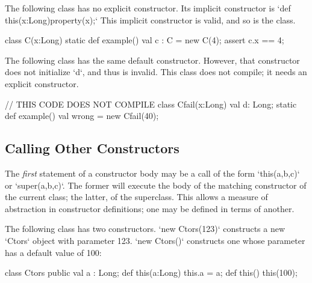 \begin{ex}
The following class has no explicit constructor.
Its implicit constructor is 
\xcd`def this(x:Long){property(x);}`
This implicit constructor is valid, and so is the class. 
\begin{xten}
class C(x:Long) {
  static def example() {
    val c : C = new C(4);
    assert c.x == 4;
  }
}
\end{xten}
\noindent 


The following class has the same default constructor.  However, that
constructor does not initialize \xcd`d`, and thus is invalid.  This 
class does not compile; it needs an explicit constructor.
\begin{xten}
// THIS CODE DOES NOT COMPILE
class Cfail(x:Long) {
  val d: Long;
  static def example() {
    val wrong = new Cfail(40);
  }
}
\end{xten}
%


\end{ex}

\subsection{Calling Other Constructors}
\label{sect:call-another-ctor}

The {\em first} statement of a constructor body may be a call of the form 
\xcd`this(a,b,c)` or \xcd`super(a,b,c)`.  The former will execute the body of
the matching constructor of the current class; the latter, of the superclass. 
This allows a measure of abstraction in constructor definitions; one may be
defined in terms of another.

\begin{ex}
The following class has two constructors.  \xcd`new Ctors(123)` constructs a
new \xcd`Ctors` object with parameter 123.  \xcd`new Ctors()` constructs one
whose parameter has a default value of 100: 
\begin{xten}
class Ctors {
  public val a : Long;
  def this(a:Long) { this.a = a; }
  def this()      { this(100);  }
}
\end{xten}
\end{ex}

